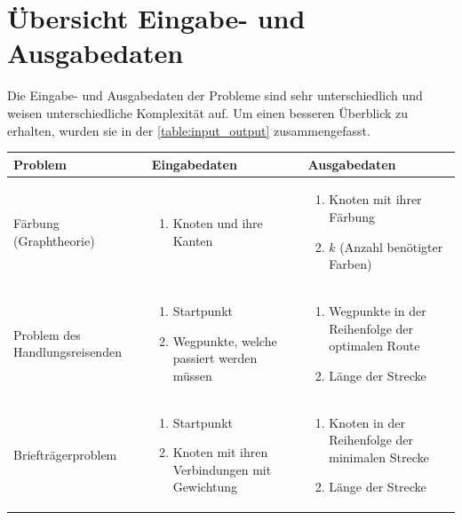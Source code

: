 \newpage
\section{Übersicht Eingabe- und Ausgabedaten \resultAssignment{[R2]}}\label{overview_input_output}
Die Eingabe- und Ausgabedaten der Probleme sind sehr unterschiedlich und weisen unterschiedliche Komplexität auf. Um einen besseren Überblick zu erhalten, wurden sie in der 
\autoref{table:input_output} zusammengefasst.
\begin{table}[ht]
\centering
  \begin{tabular}{ p{3cm} | p{5.4cm} | p{5.4cm} }
	\hline
	\rowcolor{gray}
	\textbf{Problem}				& \textbf{Eingabedaten}								& \textbf{Ausgabedaten}\\ \hline
	Färbung (Graphtheorie)			& \begin{enumerate}
								\item Knoten und ihre Kanten
							   \end{enumerate}				
							&  \begin{enumerate}
								\item Knoten mit ihrer Färbung
								\item $k$ (Anzahl benötigter Farben)
							   \end{enumerate}	\\ \hline
	Problem des Handlungsreisenden		& \begin{enumerate}
								\item Startpunkt
								\item Wegpunkte, welche passiert werden müssen
							   \end{enumerate}				
							&  \begin{enumerate}
								\item Wegpunkte in der Reihenfolge der optimalen Route
								\item Länge der Strecke
							   \end{enumerate}	\\ \hline
	Briefträgerproblem	 			& \begin{enumerate}
								\item Startpunkt
								\item Knoten mit ihren Verbindungen mit Gewichtung
							   \end{enumerate}				
							&  \begin{enumerate}
								\item Knoten in der Reihenfolge der minimalen Strecke
								\item Länge der Strecke

\end{enumerate}
\end{tabular}
\end{table}
